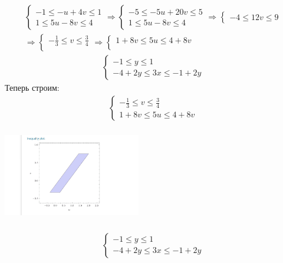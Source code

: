 \documentclass[a4paper,11pt]{article}
\begin{document}
	\begin{gather*}	
	\begin{cases}
	-1 \leqslant -u + 4v \leqslant 1 \\[2pt]
	1 \leqslant 5u - 8v \leqslant 4
	\end{cases}	
	\Rightarrow
	\begin{cases}
	-5 \leqslant -5u + 20v \leqslant 5 \\[2pt]
	1 \leqslant 5u - 8v \leqslant 4
	\end{cases}
	\Rightarrow	
	\begin{cases}
	-4 \leqslant 12v \leqslant 9
	\end{cases}
	\\[2pt]	
	\Rightarrow
	\begin{cases}
	-\frac13 \leqslant v \leqslant \frac34 \\[2pt]
	\end{cases}
	\Rightarrow
	\begin{cases}
	1 + 8v \leqslant 5u \leqslant 4 + 8v \\[2pt]
	\end{cases}
	\end{gather*}
	\begin{gather*}
	\begin{cases}
	-1 \leqslant y \leqslant 1 \\[2pt]
	-4 + 2y \leqslant 3x \leqslant -1 + 2y 
	\end{cases}
	\end{gather*}
	Теперь строим:
	\begin{gather*}
	\begin{cases}
	-\frac13 \leqslant v \leqslant \frac34 \\[2pt]
	1 + 8v \leqslant 5u \leqslant 4 + 8v
	\end{cases}
	\end{gather*}
	\begin{center}
		\includegraphics[width = 60mm, height=40mm]{images/7.png}
	\end{center}
	\begin{gather*}
	\begin{cases}
	-1 \leqslant y \leqslant 1 \\[2pt]
	-4 + 2y \leqslant 3x \leqslant -1 + 2y 
	\end{cases}
	\end{gather*}
\end{document}
